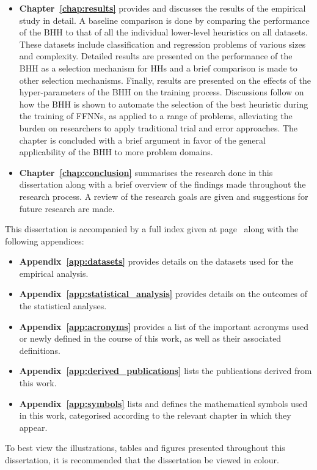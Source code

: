 \begin{itemize}
      \item \textbf{Chapter~\ref{chap:results}} provides and discusses the results of the empirical study in detail. A baseline comparison is done by comparing the performance of the \Ac{BHH} to that of all the individual lower-level heuristics on all datasets. These datasets include classification and regression problems of various sizes and complexity.  Detailed results are presented on the performance of the \Ac{BHH} as a selection mechanism for \acp{HH} and a brief comparison is made to other selection mechanisms. Finally, results are presented on the effects of the hyper-parameters of the \Ac{BHH} on the training process. Discussions follow on how the \Ac{BHH} is shown to automate the selection of the best heuristic during the training of \acp{FFNN}, as applied to a range of problems, alleviating the burden on researchers to apply traditional trial and error approaches. The chapter is concluded with a brief argument in favor of the general applicability of the \Ac{BHH} to more problem domains.

      \item \textbf{Chapter~\ref{chap:conclusion}} summarises the research done in this dissertation along with a brief overview of the findings made throughout the research process. A review of the research goals are given and suggestions for future research are made.
\end{itemize}

\noindent
This dissertation is accompanied by a full index given at page~\pageref{index} along with the following appendices:

\begin{itemize}
      \item \textbf{Appendix~\ref{app:datasets}} provides details on the datasets used for the empirical analysis.

      \item \textbf{Appendix~\ref{app:statistical_analysis}} provides details on the outcomes of the statistical analyses.

      \item \textbf{Appendix~\ref{app:acronyms}} provides a list of the important acronyms used or newly defined in the course of this work, as well as their associated definitions.

      \item \textbf{Appendix~\ref{app:derived_publications}} lists the publications derived from this work.

      \item \textbf{Appendix~\ref{app:symbols}} lists and defines the mathematical symbols used in this work, categorised according to the relevant chapter in which they appear.
\end{itemize}

\noindent
To best view the illustrations, tables and figures presented throughout this dissertation, it is recommended that the dissertation be viewed in colour.
